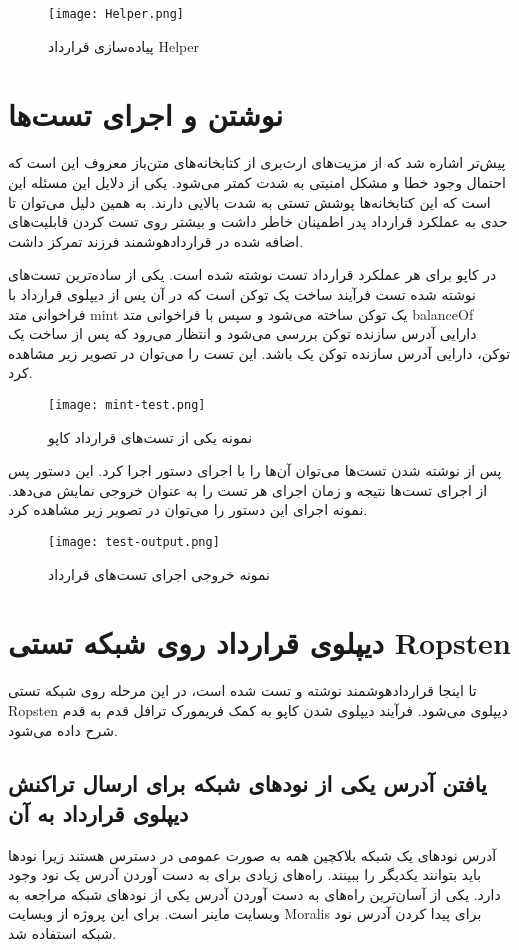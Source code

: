 \begin{figure}[ht]
\centerline{\texttt{[image: Helper.png]}}
\caption{پیاده‌سازی قرارداد Helper}
\label{fig:Helper}
\end{figure}

\section{نوشتن و اجرای تست‌ها}
پیش‌تر اشاره شد که از مزیت‌های ارث‌بری از کتابخانه‌های متن‌باز معروف این است که احتمال وجود خطا و مشکل امنیتی به شدت کمتر می‌شود. یکی از دلایل این مسئله این است که این کتابخانه‌ها پوشش تستی به شدت بالایی دارند. به همین دلیل می‌توان تا حدی به عملکرد قرارداد پدر اطمینان خاطر داشت و بیشتر روی تست کردن قابلیت‌های اضافه شده در قراردادهوشمند فرزند تمرکز داشت.

در کاپو برای هر عملکرد قرارداد تست نوشته شده است. یکی از ساده‌ترین تست‌های نوشته شده تست فرآیند ساخت یک توکن است که در آن پس از دیپلوی قرارداد با فراخوانی متد mint یک توکن ساخته می‌شود و سپس با فراخوانی متد balanceOf دارایی آدرس سازنده توکن بررسی می‌شود و انتظار می‌رود که پس از ساخت یک توکن، دارایی آدرس سازنده توکن یک باشد. این تست را می‌توان در تصویر زیر مشاهده کرد.

\begin{figure}[ht]
\centerline{\texttt{[image: mint-test.png]}}
\caption{نمونه یکی از تست‌های قرارداد کاپو}
\label{fig:mint-test}
\end{figure}

پس از نوشته شدن تست‌ها می‌توان آن‌ها را با اجرای دستور
اجرا کرد. این دستور پس از اجرای تست‌ها نتیجه و زمان اجرای هر تست را به عنوان خروجی نمایش می‌دهد. نمونه اجرای این دستور را می‌توان در تصویر زیر مشاهده کرد.

\begin{figure}[ht]
\centerline{\texttt{[image: test-output.png]}}
\caption{نمونه خروجی اجرای تست‌های قرارداد}
\label{fig:test-output}
\end{figure}

\section{دیپلوی قرارداد روی شبکه تستی Ropsten}
تا اینجا قراردادهوشمند نوشته و تست شده است، در این مرحله روی شبکه تستی Ropsten دیپلوی می‌شود. فرآیند دیپلوی شدن کاپو به کمک فریمورک ترافل قدم به قدم شرح داده می‌شود.

\subsection{یافتن آدرس یکی از نود‌های شبکه برای ارسال تراکنش دیپلوی قرارداد به آن}
آدرس نود‌های یک شبکه بلاکچین همه به صورت عمومی در دسترس هستند زیرا نودها باید بتوانند یکدیگر را ببینند. راه‌های زیادی برای به دست آوردن آدرس یک نود وجود دارد. یکی از آسان‌ترین راه‌های به دست آوردن آدرس یکی از نود‌های شبکه مراجعه به وبسایت ماینر است. برای این پروژه از وبسایت Moralis
برای پیدا کردن آدرس نود شبکه استفاده شد.

